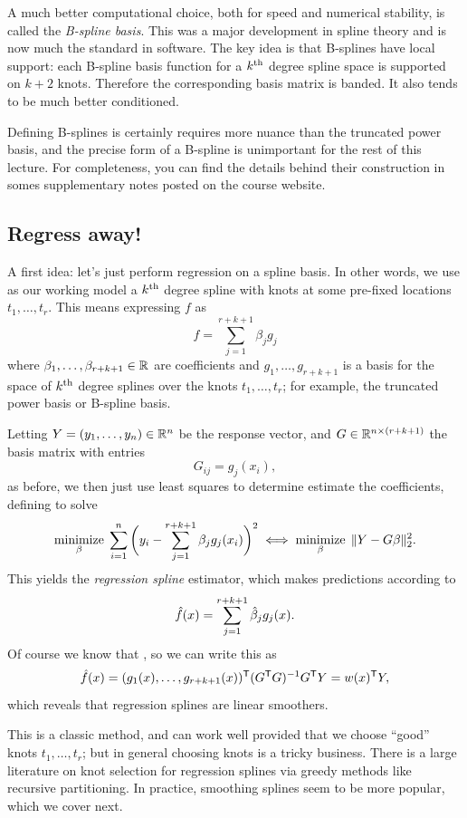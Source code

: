 \documentclass{article}
\begin{document}
A much better computational choice, both for speed and numerical stability, is 
called the \emph{B-spline basis}. This was a major development in spline theory 
and is now much the standard in software. The key idea is that B-splines have
local support: each B-spline basis function for a $k^{\text{th}}$ degree spline space is
supported on $k+2$ knots. Therefore the corresponding basis matrix is banded. It
also tends to be much better conditioned.  

Defining B-splines is certainly requires more nuance than the truncated power
basis, and the precise form of a B-spline is unimportant for the rest of this
lecture. For completeness, you can find the details behind their construction in
somes supplementary notes posted on the course website.

\subsection{Regress away!}

A first idea: let's just perform regression on a spline basis. In other words,
we use as our working model a $k^{\text{th}}$ degree spline with knots at some pre-fixed 
locations $t_1,\dots,t_r$. This means expressing $f$ as  
\[
f = \sum_{j=1}^{r+k+1} \beta_j g_j
\]
where $\beta_1,\dots,\beta_{r+k+1} \in \mathbb{R}$ are coefficients and
$g_1,\dots,g_{r+k+1}$ is a basis for the space of $k^{\text{th}}$ degree splines over the
knots $t_1,\dots,t_r$; for example, the truncated power basis or B-spline basis.    

Letting $Y=(y_1,\dots,y_n) \in \mathbb{R}^n$ be the response vector, and $G \in \mathbb{R}^{n
  \times (r+k+1)}$ the basis matrix with entries   
\[
G_{ij} = g_j(x_i),
\]
as before, we then just use least squares to determine estimate the
coefficients, defining  to 
solve 
\[
\mathop{\mathrm{minimize}}_\beta \; \sum_{i=1}^n \bigg(y_i -\sum_{j=1}^{r+k+1} \beta_j g_j(x_i) 
\bigg)^2 \iff \mathop{\mathrm{minimize}}_\beta \; \|Y - G\beta\|_2^2.
\]
This yields the \emph{regression spline} estimator, which makes predictions
according to   
\[
\hat{f}(x) = \sum_{j=1}^{r+k+1} \hat{\beta}_j g_j(x).
\]
Of course we know that , so we can write
this as 
\[
\hat{f}(x) = (g_1(x),\dots,g_{r+k+1}(x))^{\mathsf{T}} (G^{\mathsf{T}} G)^{-1} G^{\mathsf{T}} Y = w(x)^{\mathsf{T}} Y,  
\]
which reveals that regression splines are linear smoothers.

This is a classic method, and can work well provided that we choose ``good''
knots $t_1,\dots,t_r$; but in general choosing knots is a tricky business. There
is a large literature on knot selection for regression splines via greedy
methods like recursive partitioning. In practice, smoothing splines seem to be
more popular, which we cover next.
\end{document}
